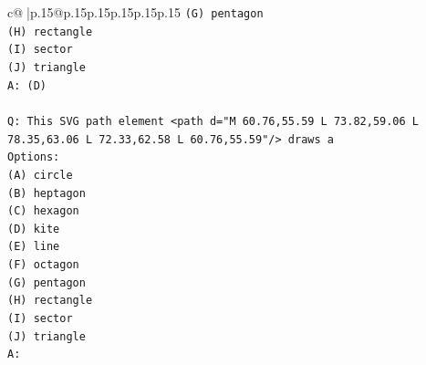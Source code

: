 \documentclass{article}
\begin{document}
{\begin{supertabular}{c@{$\;$}|p{.15\linewidth}@{}p{.15\linewidth}p{.15\linewidth}p{.15\linewidth}p{.15\linewidth}p{.15\linewidth}}
{{{\texttt{(G) pentagon} \\
\texttt{(H) rectangle} \\
\texttt{(I) sector} \\
\texttt{(J) triangle} \\
\texttt{A: (D)} \\
\\ 
\texttt{Q: This SVG path element <path d="M 60.76,55.59 L 73.82,59.06 L 78.35,63.06 L 72.33,62.58 L 60.76,55.59"/> draws a} \\
\texttt{Options:} \\
\texttt{(A) circle} \\
\texttt{(B) heptagon} \\
\texttt{(C) hexagon} \\
\texttt{(D) kite} \\
\texttt{(E) line} \\
\texttt{(F) octagon} \\
\texttt{(G) pentagon} \\
\texttt{(H) rectangle} \\
\texttt{(I) sector} \\
\texttt{(J) triangle} \\
\texttt{A:} \\
            }
        }
    }
     \\ \\


\end{supertabular}}
\end{document}
